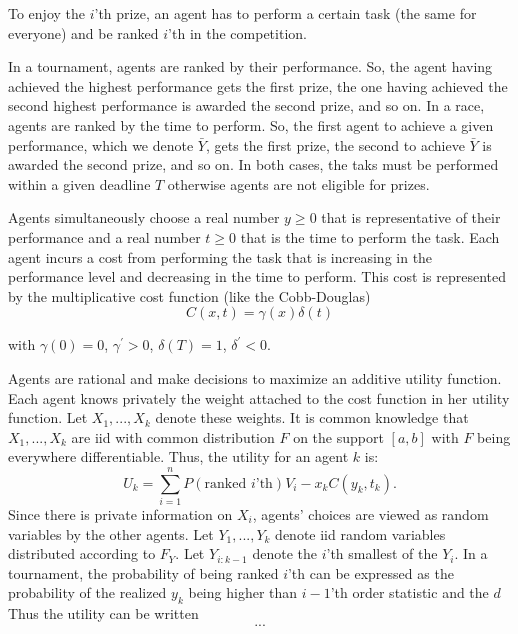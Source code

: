 \documentclass[11pt]{article}
\begin{document}
To enjoy the $i$'th prize, an agent has to perform a certain task (the same for everyone) and be ranked $i$'th in the competition. 

In a tournament, agents are ranked by their performance. So, the agent having achieved the highest performance gets the first prize, the one having achieved the second highest performance is awarded the second prize, and so on. In a race, agents are ranked by the time to perform. So, the first agent to achieve a given performance, which we denote $\bar Y$, gets the first prize, the second to achieve $\bar Y$ is awarded the second prize, and so on. In both cases, the taks must be performed within a given deadline $T$ otherwise agents are not eligible for prizes. 

Agents simultaneously choose a real number $y\geq 0$ that is representative of their performance and a real number $t\geq 0$ that is the time to perform the task. Each agent incurs a cost from performing the task that is increasing in the performance level and decreasing in the time to perform. This cost is represented by the multiplicative cost function (like the Cobb-Douglas) 
\begin{equation}
  C(x, t) = \gamma(x) \delta(t) 
\end{equation}

with $\gamma(0)=0$, $\gamma^\prime>0$, $\delta(T)=1$, $\delta^\prime<0$.

Agents are rational and make decisions to maximize an additive utility function. Each agent knows privately the weight attached to the cost function in her utility function. Let $X_1, ..., X_k$ denote these weights. It is common knowledge that $X_1,..., X_k$ are iid with common distribution $F$ on the support $[a, b]$ with $F$ being everywhere differentiable. Thus, the utility for an agent $k$ is:
\begin{equation}
  U_k = \sum_{i=1}^n P(\text{ranked $i$'th}) V_i - x_k C(y_k, t_k).
\end{equation}
Since there is private information on $X_i$, agents' choices are viewed as random variables by the other agents. Let $Y_1, ..., Y_k$ denote iid random variables distributed according to $F_Y$. Let $Y_{i:k-1}$ denote the $i$'th smallest of the $Y_i$. 
In a tournament, the probability of being ranked $i$'th can be expressed as the probability of the realized $y_k$ being higher than $i-1$'th order statistic and the $d$
Thus the utility can be written
\begin{equation}
  ... 
\end{equation}
\end{document}
